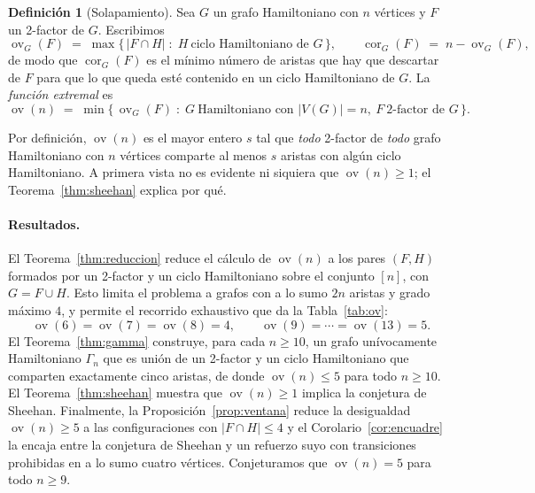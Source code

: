\documentclass[11pt,a4paper]{article}
\theoremstyle{definition}
\newtheorem{definicion}[teorema]{Definición}
\theoremstyle{remark}
\newcommand{\ov}{\operatorname{ov}}
\newcommand{\cor}{\operatorname{cor}}
\begin{document}
\begin{definicion}[Solapamiento]\label{def:ov}
Sea $G$ un grafo Hamiltoniano con $n$ vértices y $F$ un 2-factor de $G$. Escribimos
\[
\ov_G(F)\;=\;\max\{\,|F\cap H|\;:\;H\ \text{ciclo Hamiltoniano de }G\,\},
\qquad
\cor_G(F)\;=\;n-\ov_G(F),
\]
de modo que $\cor_G(F)$ es el mínimo número de aristas que hay que descartar de $F$ para que lo que queda esté contenido en un ciclo Hamiltoniano de $G$. La \emph{función extremal} es
\[
\ov(n)\;=\;\min\{\,\ov_G(F)\;:\;G\ \text{Hamiltoniano con }|V(G)|=n,\ F\ \text{2-factor de }G\,\}.
\]
\end{definicion}

Por definición, $\ov(n)$ es el mayor entero $s$ tal que \emph{todo} 2-factor de \emph{todo} grafo Hamiltoniano con $n$ vértices comparte al menos $s$ aristas con algún ciclo Hamiltoniano. A primera vista no es evidente ni siquiera que $\ov(n)\ge1$; el Teorema~\ref{thm:sheehan} explica por qué.

\paragraph{Resultados.} El Teorema~\ref{thm:reduccion} reduce el cálculo de $\ov(n)$ a los pares $(F,H)$ formados por un 2-factor y un ciclo Hamiltoniano sobre el conjunto $[n]$, con $G=F\cup H$. Esto limita el problema a grafos con a lo sumo $2n$ aristas y grado máximo $4$, y permite el recorrido exhaustivo que da la Tabla~\ref{tab:ov}:
\[
\ov(6)=\ov(7)=\ov(8)=4,\qquad \ov(9)=\cdots=\ov(13)=5 .
\]
El Teorema~\ref{thm:gamma} construye, para cada $n\ge10$, un grafo unívocamente Hamiltoniano $\Gamma_n$ que es unión de un 2-factor y un ciclo Hamiltoniano que comparten exactamente cinco aristas, de donde $\ov(n)\le5$ para todo $n\ge10$. El Teorema~\ref{thm:sheehan} muestra que $\ov(n)\ge1$ implica la conjetura de Sheehan. Finalmente, la Proposición~\ref{prop:ventana} reduce la desigualdad $\ov(n)\ge5$ a las configuraciones con $|F\cap H|\le4$ y el Corolario~\ref{cor:encuadre} la encaja entre la conjetura de Sheehan y un refuerzo suyo con transiciones prohibidas en a lo sumo cuatro vértices. Conjeturamos que $\ov(n)=5$ para todo $n\ge9$.
\end{document}
